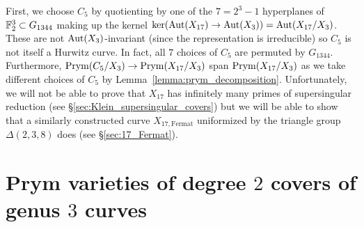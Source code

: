 \documentclass[main.tex]{subfiles}
\begin{document}
\par 
First, we choose $C_5$ by quotienting by one of the $7 = 2^3 - 1$ hyperplanes of $\mathbb{F}_2^3 \subset G_{1344}$ making up the kernel $\ker(\operatorname{\mathrm{Aut}}(X_{17}) \to \operatorname{\mathrm{Aut}}(X_3)) = \operatorname{\mathrm{Aut}}(X_{17}/X_3)$. These are not $\operatorname{\mathrm{Aut}}(X_3)$-invariant (since the representation is irreducible) so $C_5$ is not itself a Hurwitz curve. In fact, all $7$ choices of $C_5$ are permuted by $G_{1344}$. Furthermore, $\operatorname{\mathrm{Prym}}(C_5/X_3) \to \operatorname{\mathrm{Prym}}(X_{17}/X_3)$ span $\operatorname{\mathrm{Prym}}(X_{17}/X_3)$ as we take different choices of $C_5$ by Lemma~\ref{lemma:prym_decomposition}. Unfortunately, we will not be able to prove that $X_{17}$ has infinitely many primes of supersingular reduction (see \S\ref{sec:Klein_supersingular_covers}) but we will be able to show that a similarly constructed curve $X_{17, \mathrm{Fermat}}$ uniformized by the triangle group $\Delta(2,3,8)$ does (see \S\ref{sec:17_Fermat}).

\section{Prym varieties of degree $2$ covers of genus $3$ curves}
\end{document}
